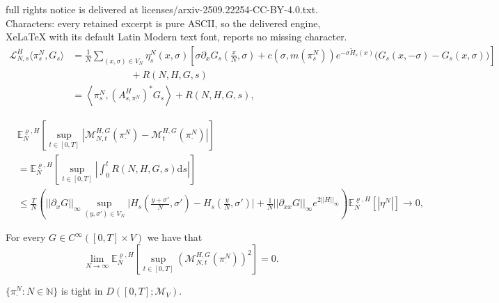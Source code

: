 \documentclass[10pt,a4paper]{amsart}
\newcommand{\E}{\mathbb{E}}
\newcommand{\dd}{\mathrm{d}}
\newcommand{\nn}{\nonumber}
\begin{document}
full rights notice is delivered at licenses/arxiv-2509.22254-CC-BY-4.0.txt. Characters: every retained excerpt is pure ASCII, so the delivered engine, XeLaTeX with its default Latin Modern text font, reports no missing character.
    \begin{align}\label{Ln}
        \nn \mathscr{L}^H_{N,s}\langle \pi^N_{s},G_s\rangle  &= \frac{1}{N} \sum_{(x,\sigma) \in V_N} \eta^N_s(x,\sigma) \left[\sigma\partial_xG_s(\tfrac{x}{N},\sigma)  + c(\sigma,m(\pi^N_s))e^{-\sigma \widetilde{H}_s(x)}\big(G_s(x,-\sigma)- G_s(x,\sigma)\big) \right]\\
        \nn&\qquad \qquad \qquad + R(N,H, G,s)\\
        &= \left\langle \pi^N_{s}, \left(\!A^{H}_{s, \pi^N_\cdot}\!\right)^{\!*} G_s\right\rangle + R(N,H, G,s),
    \end{align}

    \begin{align}\label{R1}
        \nn&\E^{\varrho,H}_N\left[\sup_{t\in[0,T]} \left|\mathscr{M}_{N,t}^{H,G}(\pi^N_{\cdot}) - \mathscr{M}_t^{H,G}(\pi^N_{\cdot})\right|\right] \\
        \nn&= \E^{\varrho,H}_N\left[ \sup_{t\in[0,T]}\left|\int_0^t R(N,H,G,s)\dd s\right| \right]\\
        & \leq \frac{T}{N} \left(||\partial_xG||_\infty\sup_{(y,\sigma')\in V_N}\big|H_s(\tfrac{y+\sigma'}{N},\sigma') - H_s(\tfrac{y}{N},\sigma')\big| + \frac{1}{N}||\partial_{xx}G||_\infty e^{2||H||_\infty}\right)  \E^{\varrho,H}_N\left[|\eta^N|\right] \to 0,
    \end{align}

\begin{Lemma}\label{lemma 2.2}
    For every $G \in C^\infty([0,T]\times V)$ we have that 
    \begin{equation}
        \lim_{N\to\infty} \E^{\varrho,H}_N\left[\sup_{t\in[0,T]} \left(\mathscr{M}_{N,t}^{H,G}(\pi^N_{\cdot})\right)^2\right]=0.
    \end{equation}
\end{Lemma}

\begin{Proposition}
    $\{\pi^N_{\cdot}:N\in\mathbb{N}\}$ is tight in $D([0,T];\mathcal{M}_V)$.
\end{Proposition}
\end{document}
